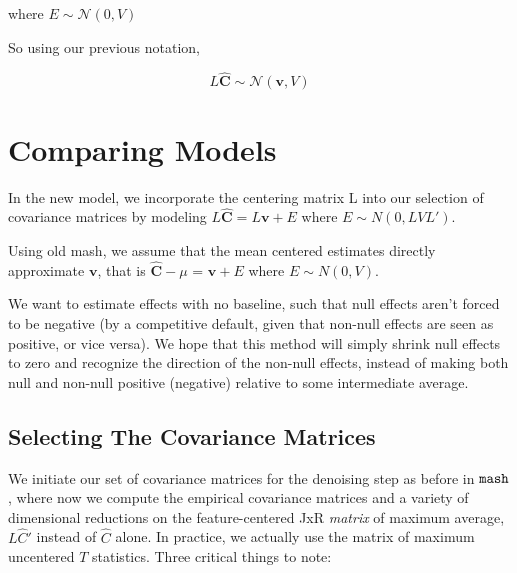 \documentclass[11pt, oneside]{article}   	%
\newcommand{\Norm}{{\mathcal{N}}} %
\newcommand{\chat}{\bm{\hat{C}}}
\newcommand{\vb}{\bm{v}}
\def\mash{{\tt mash}}
\begin{document}
\begin{itemize}
where $E \sim \Norm (0, V)$

So using our previous notation, 

\begin{equation}
\label{mashlik}
L \chat \sim \Norm(\vb,V)
\end{equation}


\section{Comparing Models}


In the new model, we incorporate the centering matrix L into our selection of covariance matrices by modeling $L\chat = L \vb + E$ where $E \sim N(0,LVL')$.

Using old mash, we assume that the mean centered estimates directly approximate $\vb$, that is $\chat-\mu$ = $\vb + E$ where $E \sim N(0,V)$. 

We want to estimate effects with no baseline, such that null effects aren't forced to be negative (by a competitive default, given that non-null effects are seen as positive, or vice versa). We hope that this method will simply shrink null effects to zero and recognize the direction of the non-null effects, instead of making both null and non-null positive (negative) relative to some intermediate average.


\subsection{Selecting The Covariance Matrices}

We initiate our set of covariance matrices for the denoising step as before in $\mash$, where now we compute the empirical covariance matrices and a variety of dimensional reductions on the feature-centered JxR \textit{matrix} of maximum average, $L \hat{C}' $ instead of $\hat{C}$ alone. In practice, we actually use the matrix of maximum uncentered $T$ statistics. Three critical things to note:


\end{itemize}
\end{document}
